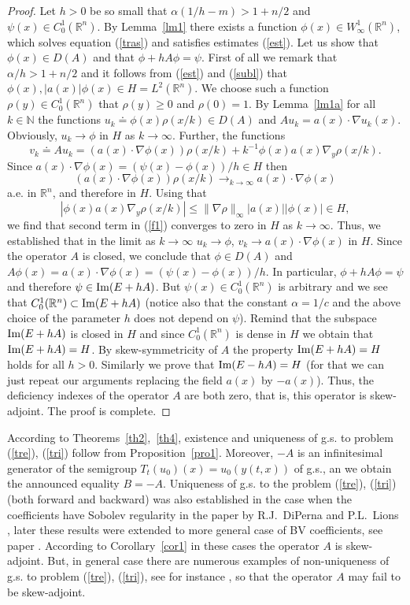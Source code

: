 \documentclass[12pt]{article}
\newcommand{\R}{{\mathbb R}}
\newcommand{\N}{{\mathbb N}}
\renewcommand{\Im}{\mathop{\rm Im}}
\numberwithin{equation}{section}
\theoremstyle{plain}
\theoremstyle{definition}
\begin{document}
\begin{proof}
Let $h>0$ be so small that $\alpha(1/h-m)>1+n/2$ and $\psi(x)\in C_0^1(\R^n)$. By Lemma~\ref{lm1} there exists a function  $\phi(x)\in W_\infty^1(\R^n)$, which solves equation (\ref{tras}) and satisfies estimates (\ref{est}).
Let us show that $\phi(x)\in D(A)$ and that $\phi+hA\phi=\psi$.
First of all we remark that $\alpha/h>1+n/2$ and it follows from (\ref{est}) and (\ref{subl}) that $\phi(x), |a(x)|\phi(x)\in H=L^2(\R^n)$. We choose such a function $\rho(y)\in C_0^1(\R^n)$ that $\rho(y)\ge 0$ and $\rho(0)=1$. By Lemma~\ref{lm1a} for all $k\in\N$ the functions $u_k\doteq\phi(x)\rho(x/k)\in D(A)$ and $Au_k=a(x)\cdot\nabla u_k(x)$. Obviously, $u_k\to\phi$ in $H$ as $k\to\infty$.
Further, the functions
\begin{equation}\label{f1}
v_k\doteq Au_k=(a(x)\cdot\nabla\phi(x))\rho(x/k)+k^{-1}\phi(x)a(x)\nabla_y\rho(x/k).
\end{equation}
Since $a(x)\cdot\nabla\phi(x)=(\psi(x)-\phi(x))/h\in H$ then
\[
(a(x)\cdot\nabla\phi(x))\rho(x/k)\mathop{\to}_{k\to\infty} a(x)\cdot\nabla\phi(x)
\]
a.e. in $\R^n$, and therefore in $H$. Using that
\[
|\phi(x)a(x)\nabla_y\rho(x/k)|\le\|\nabla\rho\|_\infty|a(x)||\phi(x)|\in H,
\]
we find that second term in (\ref{f1}) converges to zero in $H$ as $k\to\infty$. Thus, we established that in the limit as $k\to\infty$
$u_k\to\phi$, $v_k\to a(x)\cdot\nabla\phi(x)$ in $H$. Since the operator $A$ is closed, we conclude that
$\phi\in D(A)$ and $A\phi(x)=a(x)\cdot\nabla\phi(x)=(\psi(x)-\phi(x))/h$. In particular, $\phi+hA\phi=\psi$ and therefore  $\psi\in\Im(E+hA)$. But $\psi(x)\in C_0^1(\R^n)$ is arbitrary and we see that $C_0^1(\R^n)\subset\Im(E+hA)$ (notice also that the constant $\alpha=1/c$ and the above choice of the parameter $h$ does not depend on $\psi$). Remind that the subspace $\Im(E+hA)$ is closed in $H$ and since $C_0^1(\R^n)$ is dense in $H$ we obtain that $\Im(E+hA)=H$. By skew-symmetricity of $A$ the property $\Im(E+hA)=H$ holds for all $h>0$. Similarly we prove that $\Im(E-hA)=H$ (for that we can just repeat our arguments replacing the field $a(x)$ by  $-a(x)$).
Thus, the deficiency indexes of the operator $A$ are both zero, that is, this operator is skew-adjoint. The proof is complete.
\end{proof}

According to Theorems~\ref{th2},~\ref{th4}, existence and uniqueness of g.s. to problem (\ref{tre}), (\ref{tri}) follow from Proposition~\ref{pro1}. Moreover, $-A$ is an infinitesimal generator of the semigroup $T_t(u_0)(x)=u_0(y(t,x))$ of g.s., an we obtain the announced equality $B=-A$. Uniqueness of g.s. to the problem (\ref{tre}), (\ref{tri}) (both forward and backward) was also established in the case when the coefficients have Sobolev regularity in the paper by R.J.~DiPerna and P.L.~Lions  \cite{DiL}, later these results were extended to more general case of BV coefficients, see paper \cite{Amb}. According to Corollary~\ref{cor1} in these cases the operator $A$ is skew-adjoint. But, in general case there are numerous examples of non-uniqueness of g.s. to problem (\ref{tre}), (\ref{tri}), see for instance \cite{Aiz,Br,CLR,Dep,PaTr}, so that the operator $A$ may fail to be skew-adjoint.
\end{document}
